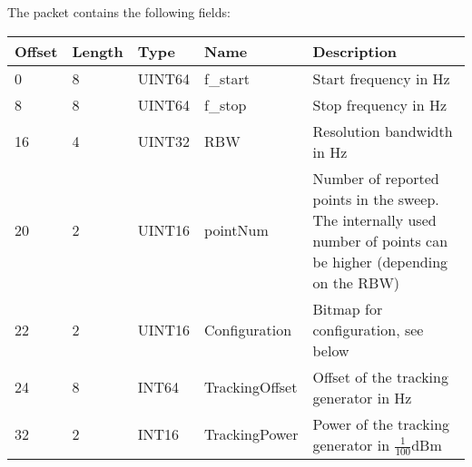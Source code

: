 \documentclass[a4paper,11pt]{article}
\begin{document}
The packet contains the following fields:
\begin{ThreePartTable}
\setlength\tabcolsep{3pt}

\begin{longtable}{p{} |  p{}  |  p{}| p{} | p{}}
\toprule
\textbf{Offset} &\textbf{Length} &\textbf{Type} & \textbf{Name} &\textbf{Description} \\ 
\hline
\endhead
\midrule[\heavyrulewidth]
\endfoot  
\midrule[\heavyrulewidth]
\endlastfoot

0 & 8 & UINT64 & f\_start & Start frequency in Hz \\
8 & 8 & UINT64 & f\_stop & Stop frequency in Hz \\
16 & 4 & UINT32 & RBW & Resolution bandwidth in Hz \\
20 & 2 & UINT16 & pointNum & Number of reported points in the sweep. The internally used number of points can be higher (depending on the RBW) \\
22 & 2 & UINT16 & Configuration & Bitmap for configuration, see below \\
24 & 8 & INT64 & TrackingOffset & Offset of the tracking generator in Hz \\
32 & 2 & INT16 & TrackingPower & Power of the tracking generator in $\frac{1}{100}$dBm \\
\end{longtable}   
\end{ThreePartTable}
\end{document}
